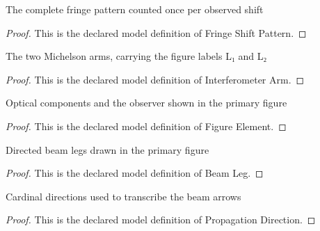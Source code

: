 \begin{definition}
  \label{def:physics:phyx-mini-0250:phyxminiproblems-problemphyxmini0250-fringeshiftpattern}
  The complete fringe pattern counted once per observed shift
\end{definition}
\begin{proof}
  This is the declared model definition of Fringe Shift Pattern.
\end{proof}
\begin{definition}
  \label{def:physics:phyx-mini-0250:phyxminiproblems-problemphyxmini0250-interferometerarm}
  The two Michelson arms, carrying the figure labels L₁ and L₂
\end{definition}
\begin{proof}
  This is the declared model definition of Interferometer Arm.
\end{proof}
\begin{definition}
  \label{def:physics:phyx-mini-0250:phyxminiproblems-problemphyxmini0250-figureelement}
  Optical components and the observer shown in the primary figure
\end{definition}
\begin{proof}
  This is the declared model definition of Figure Element.
\end{proof}
\begin{definition}
  \label{def:physics:phyx-mini-0250:phyxminiproblems-problemphyxmini0250-beamleg}
  Directed beam legs drawn in the primary figure
\end{definition}
\begin{proof}
  This is the declared model definition of Beam Leg.
\end{proof}
\begin{definition}
  \label{def:physics:phyx-mini-0250:phyxminiproblems-problemphyxmini0250-propagationdirection}
  Cardinal directions used to transcribe the beam arrows
\end{definition}
\begin{proof}
  This is the declared model definition of Propagation Direction.
\end{proof}
